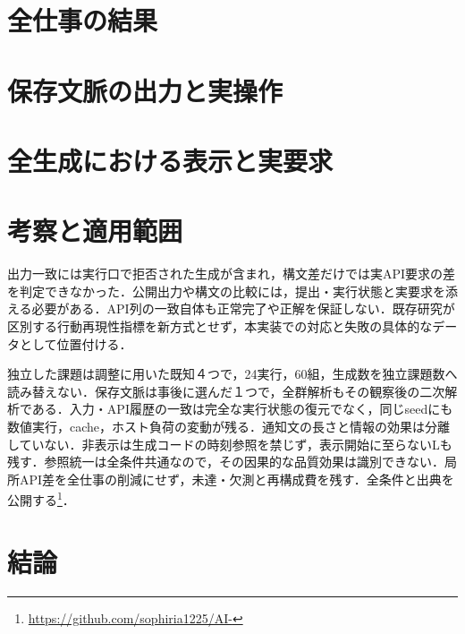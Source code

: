 \documentclass[uplatex,a4paper,twocolumn,10pt]{jsarticle}
\begin{document}
\section{全仕事の結果}





\section{保存文脈の出力と実操作}


\section{全生成における表示と実要求}


\section{考察と適用範囲}
出力一致には実行口で拒否された生成が含まれ，構文差だけでは実API要求の差を判定できなかった．公開出力や構文の比較には，提出・実行状態と実要求を添える必要がある．API列の一致自体も正常完了や正解を保証しない．既存研究が区別する行動再現性指標を新方式とせず，本実装での対応と失敗の具体的なデータとして位置付ける．

独立した課題は調整に用いた既知４つで，24実行，60組，生成数を独立課題数へ読み替えない．保存文脈は事後に選んだ１つで，全群解析もその観察後の二次解析である．入力・API履歴の一致は完全な実行状態の復元でなく，同じseedにも数値実行，cache，ホスト負荷の変動が残る．通知文の長さと情報の効果は分離していない．非表示は生成コードの時刻参照を禁じず，表示開始に至らないLも残す．参照統一は全条件共通なので，その因果的な品質効果は識別できない．局所API差を全仕事の削減にせず，未達・欠測と再構成費を残す．全条件と出典を公開する\footnote{\url{https://github.com/sophiria1225/AI-}}．

\section{結論}

\end{document}
